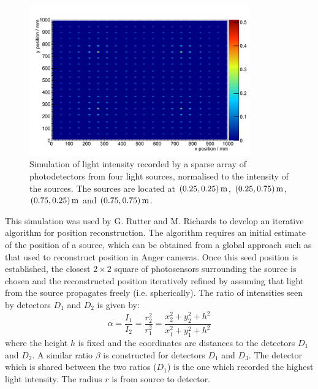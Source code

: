 \begin{figure}
\centering
\includegraphics[width=0.85\textwidth]{chapters/detectorphysics_images/four-sources}
\caption[Simulation of light intensity recorded by a sparse array of photodetectors]{\label{fig:flux-example}Simulation of light intensity recorded by a sparse array of photodetectors from four light sources, normalised to the intensity of the sources. The sources are located at $(0.25, 0.25) \metre$, $(0.25, 0.75) \metre$, $(0.75, 0.25)\metre$ and $(0.75, 0.75) \metre$.} 
\end{figure}

This simulation was used by G. Rutter and M. Richards to develop an iterative algorithm for position reconstruction\citep{Rutter2011}. The algorithm requires an initial estimate of the position of a source, which can be obtained from a global approach such as that used to reconstruct position in Anger cameras\citep{Anger1958}. Once this seed position is established, the closest $2\times 2$ square of photosensors surrounding the source is chosen and the reconstructed position iteratively refined by assuming that light from the source propagates freely (i.e. spherically). The ratio of intensities seen by detectors $D_1$ and $D_2$ is given by\citep{Rutter2011}:
\begin{equation}\label{eqn:ratio-detector-intensities}
\alpha = \frac{I_1}{I_2} = \frac{r_2^2}{r_1^2} = \frac{x_2^2 + y_2^2 + h^2}{x_1^2 + y_1^2 + h^2} 
\end{equation}
where the height $h$ is fixed and the coordinates are distances to the detectors $D_1$ and $D_2$. A similar ratio $\beta$ is constructed for detectors $D_1$ and $D_3$. The detector which is shared between the two ratios ($D_1$) is the one which recorded the highest light intensity. The radius $r$ is from source to detector.

